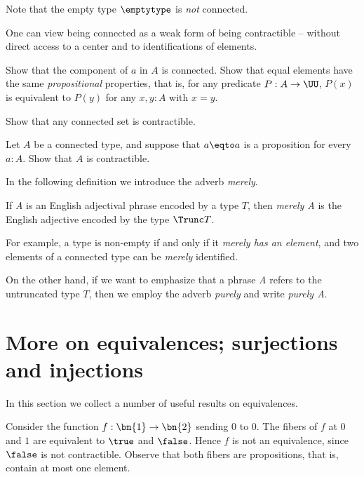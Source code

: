Note that the empty type $\emptytype$ is \emph{not} connected.

One can view being connected as a weak form
of being contractible -- without direct access to a center and to
identifications of elements.

\begin{xca}\label{xca:component-connected}
  Show that the component of $a$ in $A$ is connected.
  Show that equal elements have the same
  \emph{propositional} properties, that is,
  for any predicate $P:A\to\UU$, $P(x)$ is equivalent
  to $P(y)$ for any $x,y:A$ with $x=y$.
\end{xca}

\begin{xca}\label{xca:prop-set-trivia-2}
  Show that any connected set is contractible.
\end{xca}

\begin{xca}\label{xca:connected-trivia}
Let $A$ be a connected type, and suppose that $a \eqto a$ is a proposition for every $a:A$.
Show that $A$ is contractible.
\end{xca}

In the following definition we introduce the adverb \emph{merely}.

\begin{definition}\label{def:merely}
  If \emph{A} is an English adjectival phrase encoded by a type $T$,
  then \emph{merely A} is the English adjective encoded by the type $\Trunc T$.
\end{definition}

For example, a type is non-empty if and only if it \emph{merely has an element}, and two elements of a connected type can be \emph{merely} identified.

On the other hand, if we want to emphasize that a phrase \emph{A} refers to the
untruncated type $T$, then we employ the adverb \emph{purely}
and write \emph{purely A}.


\section{More on equivalences; surjections and injections}
\label{sec:more-on-equivalences}

In this section we collect a number of useful results on equivalences.

Consider the function $f:\bn{1}\to\bn{2}$ sending $0$ to $0$.
The fibers of $f$ at $0$ and $1$ are equivalent to $\true$ and $\false$.
Hence $f$ is not an equivalence, since $\false$ is not contractible. 
Observe that both fibers are propositions, that is, contain at most one element.

